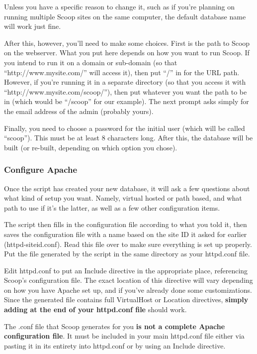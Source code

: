Unless you have a specific reason to change it, such as if you're planning on running multiple Scoop sites on the same computer, the default database name will work just fine.

After this, however, you'll need to make some choices. First is the path to Scoop on the webserver. What you put here depends on how you want to run Scoop. If you intend to run it on a domain or sub-domain (so that ``http://www.mysite.com/'' will access it), then put ``/'' in for the URL path. However, if you're running it in a separate directory (so that you access it with ``http://www.mysite.com/scoop/''), then put whatever you want the path to be in (which would be ``/scoop'' for our example). The next prompt asks simply for the email address of the admin (probably yours).

Finally, you need to choose a password for the initial user (which will be called ``scoop''). This must be at least 8 characters long. After this, the database will be built (or re-built, depending on which option you chose).

\subsubsection{Configure Apache}

Once the script has created your new database, it will ask a few questions about what kind of setup you want.  Namely, virtual hosted or path based, and what path to use if it's the latter, as well as a few other configuration items.

The script then fills in the configuration file according to what you told it, then saves the configuration file with a name based on the site ID it asked for earlier (httpd-\latexhtml{$<$}{<}siteid\latexhtml{$>$}{>}.conf).  Read this file over to make sure everything is set up properly.  Put the file generated by the script in the same directory as your httpd.conf file.

Edit httpd.conf to put an Include directive in the appropriate place, referencing Scoop's configuration file.  The exact location of this directive will vary depending on how you have Apache set up, and if you've already done some customizations.  Since the generated file contains full \latexhtml{$<$}{<}VirtualHost\latexhtml{$>$}{>} or \latexhtml{$<$}{<}Location\latexhtml{$>$}{>} directives, {\bf simply adding at the end of your httpd.conf file} should work.

The .conf file that Scoop generates for you {\bf is not a complete Apache configuration file}.  It must be included in your main httpd.conf file either via pasting it in its entirety into httpd.conf or by using an Include directive.

